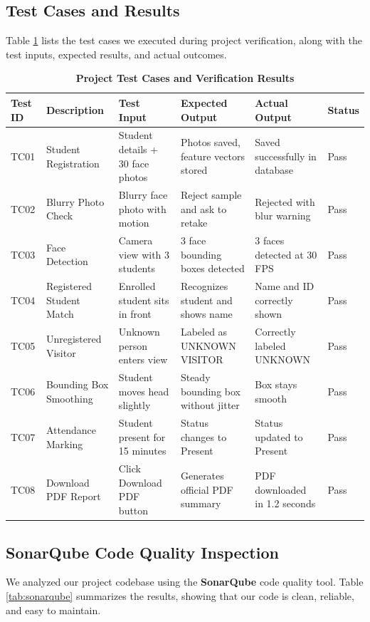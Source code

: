 \documentclass[10pt]{report}
\begin{document}
\subsection{Test Cases and Results}
\hspace{0.5cm}Table \ref{tab:testcases} lists the test cases we executed during project verification, along with the test inputs, expected results, and actual outcomes.

\begin{table}[H]
\caption{\textbf{Project Test Cases and Verification Results}}
\label{tab:testcases}
\vspace{0.3cm}
\centering
\renewcommand{\arraystretch}{1.3}
\small
\begin{tabular}{|p{1.2cm}|p{3.2cm}|p{3.0cm}|p{3.0cm}|p{2.8cm}|p{1.0cm}|}
\hline
\textbf{Test ID} & \textbf{Description} & \textbf{Test Input} & \textbf{Expected Output} & \textbf{Actual Output} & \textbf{Status} \\
\hline
TC01 & Student Registration & Student details + 30 face photos & Photos saved, feature vectors stored & Saved successfully in database & Pass \\
\hline
TC02 & Blurry Photo Check & Blurry face photo with motion & Reject sample and ask to retake & Rejected with blur warning & Pass \\
\hline
TC03 & Face Detection & Camera view with 3 students & 3 face bounding boxes detected & 3 faces detected at 30 FPS & Pass \\
\hline
TC04 & Registered Student Match & Enrolled student sits in front & Recognizes student and shows name & Name and ID correctly shown & Pass \\
\hline
TC05 & Unregistered Visitor & Unknown person enters view & Labeled as UNKNOWN VISITOR & Correctly labeled UNKNOWN & Pass \\
\hline
TC06 & Bounding Box Smoothing & Student moves head slightly & Steady bounding box without jitter & Box stays smooth & Pass \\
\hline
TC07 & Attendance Marking & Student present for 15 minutes & Status changes to Present & Status updated to Present & Pass \\
\hline
TC08 & Download PDF Report & Click Download PDF button & Generates official PDF summary & PDF downloaded in 1.2 seconds & Pass \\
\hline
\end{tabular}
\end{table}

\subsection{SonarQube Code Quality Inspection}
\hspace{0.5cm}We analyzed our project codebase using the \textbf{SonarQube} code quality tool. Table \ref{tab:sonarqube} summarizes the results, showing that our code is clean, reliable, and easy to maintain.
\end{document}
